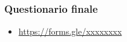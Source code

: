 
\begin{exampleframe}
    \frametitle{Questionario finale}

    \begin{itemize}
        \item \url{https://forms.gle/xxxxxxxx}
    \end{itemize}
\end{exampleframe}
